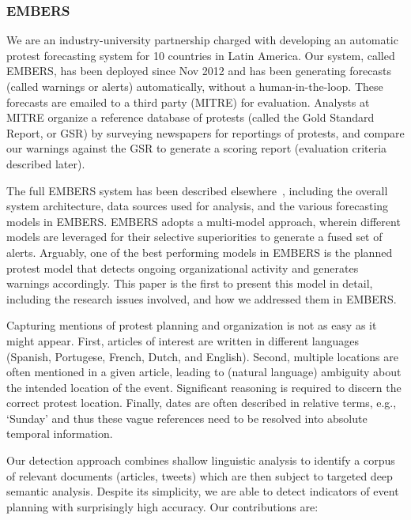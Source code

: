 \documentclass[letterpaper]{article}
\begin{document}
\vspace{-.5em}
\subsubsection{EMBERS}
We are an industry-university partnership charged with developing an
automatic protest forecasting system for 10 countries in
Latin America. Our system, called EMBERS, has been
deployed since Nov 2012 and has been generating forecasts (called
warnings or alerts) automatically, without a human-in-the-loop. These forecasts are emailed to
a third party (MITRE) for evaluation. Analysts at MITRE organize a reference
database of protests (called the Gold Standard Report,
or GSR) by surveying newspapers for reportings of protests, and
compare our warnings against the GSR to generate a scoring report (evaluation
criteria described later).

The full EMBERS system has been described elsewhere~\cite{emberskdd}, including
the overall system architecture, data sources used for analysis, and the
various forecasting models in EMBERS. EMBERS adopts a multi-model approach,
wherein different models are leveraged for their selective superiorities
to generate a fused set of alerts. Arguably, one of the
best performing models in EMBERS is the planned protest model that detects
ongoing organizational activity and generates warnings accordingly. This paper
is the first to present this model in detail, including the 
research issues involved, and how we addressed them in EMBERS.

Capturing mentions of protest planning and organization 
is not as easy as it might appear. First, articles of interest are written in
different languages (Spanish, Portugese, French, Dutch, and English). 
Second, multiple locations are often mentioned in a given article, leading
to (natural language) ambiguity about the intended location of the event.
Significant reasoning is required to discern the correct protest location.
Finally, dates are often described in relative terms, e.g., `Sunday' and 
thus these vague references need to be resolved into absolute temporal
information. 

Our detection approach 
combines shallow linguistic analysis to identify a corpus of relevant
documents (articles, tweets) which are then subject to targeted deep semantic analysis.
Despite its simplicity, we are able to
detect indicators of event planning with surprisingly high
accuracy. Our contributions are:

\end{document}
